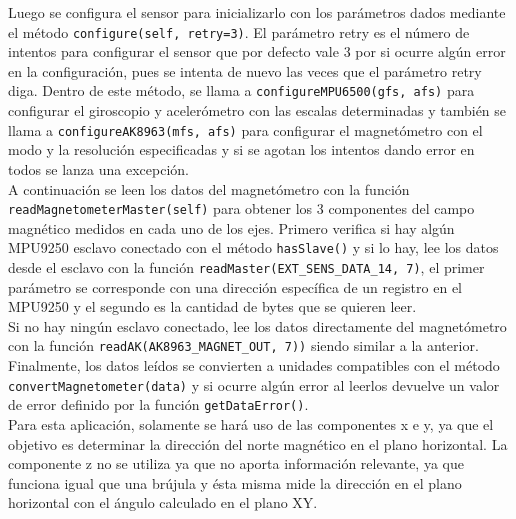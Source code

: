 Luego se configura el sensor para inicializarlo con los parámetros dados mediante el método \verb|configure(self, retry=3)|. El parámetro retry es el número de intentos para configurar el sensor que por defecto vale 3 por si ocurre algún error en la configuración, pues se intenta de nuevo las veces que el parámetro retry diga. Dentro de este método, se llama a \verb|configureMPU6500(gfs, afs)| para configurar el giroscopio y acelerómetro con las escalas determinadas y también se llama a \verb|configureAK8963(mfs, afs)| para configurar el magnetómetro con el modo y la resolución especificadas y si se agotan los intentos dando error en todos se lanza una excepción.\\


A continuación se leen los datos del magnetómetro con la función \verb|readMagnetometerMaster(self)| para obtener los 3 componentes del campo magnético medidos en cada uno de los ejes. Primero verifica si hay algún MPU9250 esclavo conectado con el método \verb|hasSlave()| y si lo hay, lee los datos desde el esclavo con la función \verb|readMaster(EXT_SENS_DATA_14, 7)|, el primer parámetro se corresponde con una dirección específica de un registro en el MPU9250 y el segundo es la cantidad de bytes que se quieren leer.\\

Si no hay ningún esclavo conectado, lee los datos directamente del magnetómetro con la función \verb|readAK(AK8963_MAGNET_OUT, 7))| siendo similar a la anterior. Finalmente, los datos leídos se convierten a unidades compatibles con el método \verb|convertMagnetometer(data)| y si ocurre algún error al leerlos devuelve un valor de error definido por la función \verb|getDataError()|.\\

Para esta aplicación, solamente se hará uso de las componentes x e y, ya que el objetivo es determinar la dirección del norte magnético en el plano horizontal. La componente z no se utiliza ya que no aporta información relevante, ya que funciona igual que una brújula y ésta misma mide la dirección en el plano horizontal con el ángulo calculado en el plano XY.


